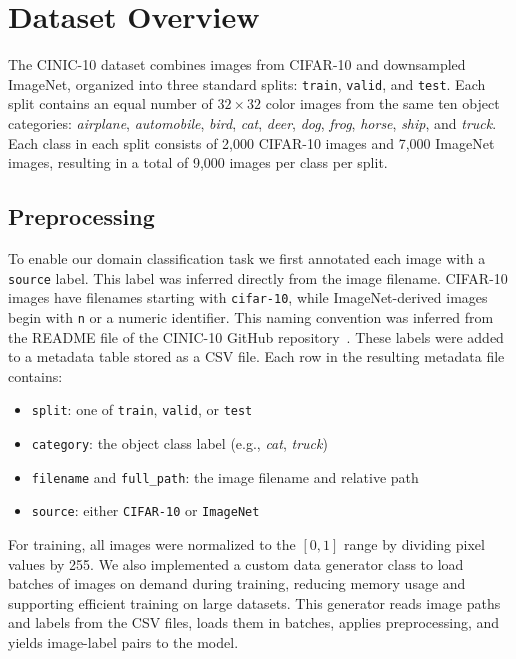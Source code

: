 \section{Dataset Overview}
\label{sec:Dataset Overview}
The CINIC-10 dataset combines images from CIFAR-10 and downsampled ImageNet, organized into three standard splits: \texttt{train}, \texttt{valid}, 
and \texttt{test}. Each split contains an equal number of $32 \times 32$ color images from the same ten object categories: \textit{airplane}, 
\textit{automobile}, \textit{bird}, \textit{cat}, \textit{deer}, \textit{dog}, \textit{frog}, \textit{horse}, \textit{ship}, and \textit{truck}.
Each class in each split consists of 2,000 CIFAR-10 images and 7,000 ImageNet images, resulting in a total of 9,000 images per class per split.

\subsection{Preprocessing}
To enable our domain classification task we first annotated each image with a \texttt{source} label. This label was inferred directly from the 
image filename. CIFAR-10 images have filenames starting with \texttt{cifar-10}, while ImageNet-derived images begin with \texttt{n} or a numeric 
identifier. This naming convention was inferred from the README file of the CINIC-10 GitHub repository~\cite{cinic10_github}. These labels were 
added to a metadata table stored as a CSV file.
Each row in the resulting metadata file contains:
\begin{itemize}
  \item \texttt{split}: one of \texttt{train}, \texttt{valid}, or \texttt{test}
  \item \texttt{category}: the object class label (e.g., \textit{cat}, \textit{truck})
  \item \texttt{filename} and \texttt{full\_path}: the image filename and relative path
  \item \texttt{source}: either \texttt{CIFAR-10} or \texttt{ImageNet}
\end{itemize}
For training, all images were normalized to the $[0, 1]$ range by dividing pixel values by 255.
We also implemented a custom data generator class to load batches of images on demand during training, reducing memory usage and supporting 
efficient training on large datasets. This generator reads image paths and labels from the CSV files, loads them in batches, applies preprocessing, 
and yields image-label pairs to the model.

